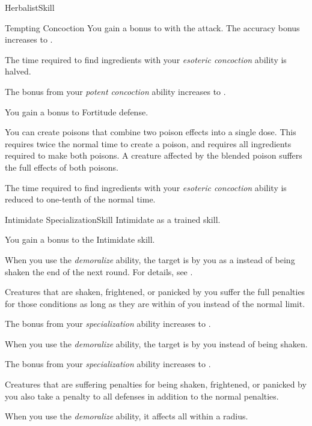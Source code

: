 \begin{feat}{Herbalist}{Skill}
\begin{attuneability}{Tempting Concoction}
            \rankline
             You gain a  bonus to  with the attack.
             The accuracy bonus increases to .
        \end{attuneability}

         The time required to find ingredients with your \textit{esoteric concoction} ability is halved.

         The bonus from your \textit{potent concoction} ability increases to .

         You gain a  bonus to Fortitude defense.

         You can create poisons that combine two poison effects into a single dose.
        This requires twice the normal time to create a poison, and requires all ingredients required to make both poisons.
        A creature affected by the blended poison suffers the full effects of both poisons.

         The time required to find ingredients with your \textit{esoteric concoction} ability is reduced to one-tenth of the normal time.
    \end{feat}

    \begin{feat}{Intimidate Specialization}{Skill}
        \featpre Intimidate as a trained skill.

         You gain a  bonus to the Intimidate skill.

         When you use the \textit{demoralize} ability, the target is \shaken by you as a  instead of being shaken the end of the next round.
        For details, see .

         Creatures that are shaken, frightened, or panicked by you suffer the full penalties for those conditions as long as they are within \distrange of you instead of the normal \medrange limit.

         The bonus from your \textit{specialization} ability increases to .

         When you use the \textit{demoralize} ability, the target is \frightened by you instead of being shaken.

         The bonus from your \textit{specialization} ability increases to .

         Creatures that are suffering penalties for being shaken, frightened, or panicked by you also take a  penalty to all defenses in addition to the normal penalties.

         When you use the \textit{demoralize} ability, it affects all  within a \largearea radius.
    \end{feat}

